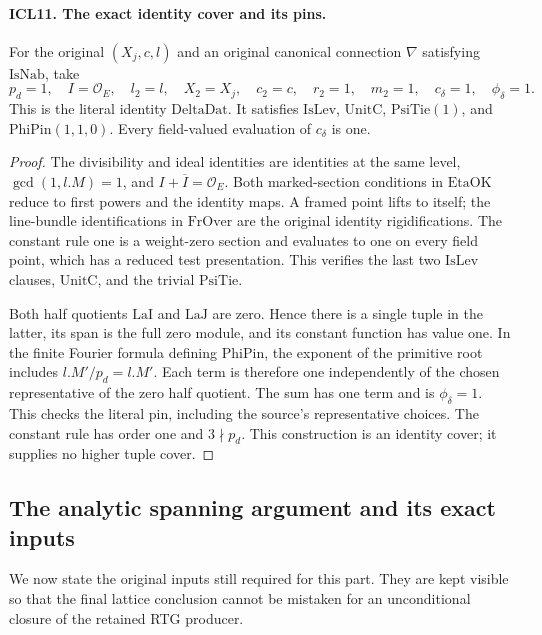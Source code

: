 \paragraph{ICL11. The exact identity cover and its pins.}
\label{claim:ICL11}
For the original \((X_j,c,l)\) and an original canonical
connection \(\nabla\) satisfying \(\mathrm{IsNab}\), take
\[
 p_d=1,\quad I=\mathcal O_E,\quad l_2=l,\quad X_2=X_j,
 \quad c_2=c,\quad r_2=1,\quad m_2=1,
 \quad c_\delta=1,\quad\phi_\delta=1.                 \tag{ICL.5}
\]
This is the literal identity \(\mathrm{DeltaDat}\).  It
satisfies \(\mathrm{IsLev}\), \(\mathrm{UnitC}\),
\(\mathrm{PsiTie}(1)\), and \(\mathrm{PhiPin}(1,1,0)\).
Every field-valued evaluation of \(c_\delta\) is one.
\begin{proof}
The divisibility and ideal identities are identities at
the same level, \(\gcd(1,l.M)=1\), and
\(I+\overline I=\mathcal O_E\).  Both marked-section
conditions in \(\mathrm{EtaOK}\) reduce to first powers
and the identity maps.  A framed point lifts to itself;
the line-bundle identifications in \(\mathrm{FrOver}\) are
the original identity rigidifications.  The constant rule
one is a weight-zero section and evaluates to one on every
field point, which has a reduced test presentation.
This verifies the last two \(\mathrm{IsLev}\) clauses,
\(\mathrm{UnitC}\), and the trivial \(\mathrm{PsiTie}\).

Both half quotients \(\mathrm{LaI}\) and
\(\mathrm{LaJ}\) are zero.  Hence there is a single tuple
in the latter, its span is the full zero module, and its
constant function has value one.  In the finite Fourier
formula defining \(\mathrm{PhiPin}\), the exponent of the
primitive root includes \(l.M'/p_d=l.M'\).  Each term is
therefore one independently of the chosen representative
of the zero half quotient.  The sum has one term and is
\(\phi_\delta=1\).  This checks the literal pin, including
the source's representative choices.  The constant rule
has order one and \(3\nmid p_d\).  This construction is
an identity cover; it supplies no higher tuple cover.
\end{proof}

\subsection{The analytic spanning argument and its exact inputs}

We now state the original inputs still required for this
part.  They are kept visible so that the final lattice
conclusion cannot be mistaken for an unconditional closure
of the retained RTG producer.

